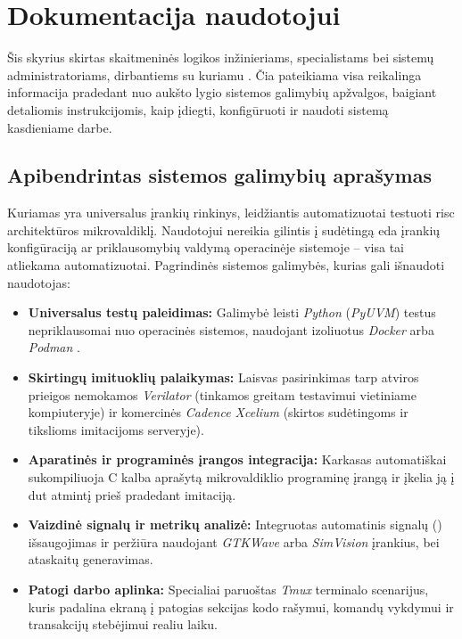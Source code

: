 \section{Dokumentacija naudotojui}\label{section:documentation}

Šis skyrius skirtas skaitmeninės logikos inžinieriams,  specialistams bei sistemų administratoriams, dirbantiems su kuriamu   . Čia pateikiama visa reikalinga informacija pradedant nuo aukšto lygio sistemos galimybių apžvalgos, baigiant detaliomis instrukcijomis, kaip įdiegti, konfigūruoti ir naudoti sistemą kasdieniame darbe.

\subsection{Apibendrintas sistemos galimybių aprašymas}

Kuriamas   yra universalus įrankių rinkinys, leidžiantis automatizuotai testuoti \gls{risc} architektūros mikrovaldiklį. Naudotojui nereikia gilintis į sudėtingą \gls{eda} įrankių konfigūraciją ar priklausomybių valdymą operacinėje sistemoje -- visa tai atliekama automatizuotai. Pagrindinės sistemos galimybės, kurias gali išnaudoti naudotojas:
\begin{itemize}
	\item \textbf{Universalus testų paleidimas:} Galimybė leisti \textit{Python} (\textit{PyUVM}) testus nepriklausomai nuo operacinės sistemos, naudojant izoliuotus \textit{Docker} arba \textit{Podman} .
	\item \textbf{Skirtingų imituoklių palaikymas:} Laisvas pasirinkimas tarp atviros prieigos nemokamos \textit{Verilator}  (tinkamos greitam testavimui vietiniame kompiuteryje) ir komercinės \textit{Cadence Xcelium} (skirtos sudėtingoms ir tikslioms imitacijoms serveryje).
	\item \textbf{Aparatinės ir programinės įrangos integracija:} Karkasas automatiškai sukompiliuoja C kalba aprašytą mikrovaldiklio programinę įrangą ir įkelia ją į \gls{dut} atmintį prieš pradedant imitaciją.
	\item \textbf{Vaizdinė signalų ir metrikų analizė:} Integruotas automatinis signalų () išsaugojimas ir peržiūra naudojant \textit{GTKWave} arba \textit{SimVision} įrankius, bei  ataskaitų generavimas.
	\item \textbf{Patogi darbo aplinka:} Specialiai paruoštas \textit{Tmux} terminalo scenarijus, kuris padalina ekraną į patogias sekcijas kodo rašymui, komandų vykdymui ir transakcijų stebėjimui realiu laiku.
\end{itemize}

